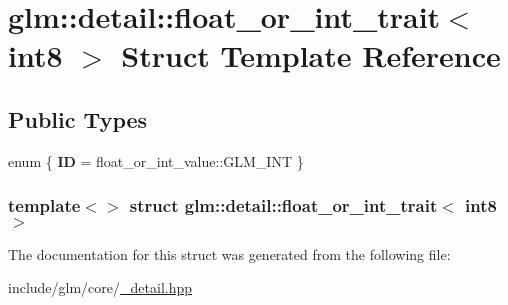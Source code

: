 \hypertarget{structglm_1_1detail_1_1float__or__int__trait_3_01int8_01_4}{\section{glm\-:\-:detail\-:\-:float\-\_\-or\-\_\-int\-\_\-trait$<$ int8 $>$ \-Struct \-Template \-Reference}
\label{structglm_1_1detail_1_1float__or__int__trait_3_01int8_01_4}
}
\subsection*{\-Public \-Types}
\begin{DoxyCompactItemize}
\item 
enum \{ {\bfseries \-I\-D} =  float\-\_\-or\-\_\-int\-\_\-value\-:\-:\-G\-L\-M\-\_\-\-I\-N\-T
 \}
\end{DoxyCompactItemize}
\subsubsection*{template$<$$>$ struct glm\-::detail\-::float\-\_\-or\-\_\-int\-\_\-trait$<$ int8 $>$}



\-The documentation for this struct was generated from the following file\-:\begin{DoxyCompactItemize}
\item 
include/glm/core/\hyperlink{__detail_8hpp}{\-\_\-detail.\-hpp}\end{DoxyCompactItemize}

